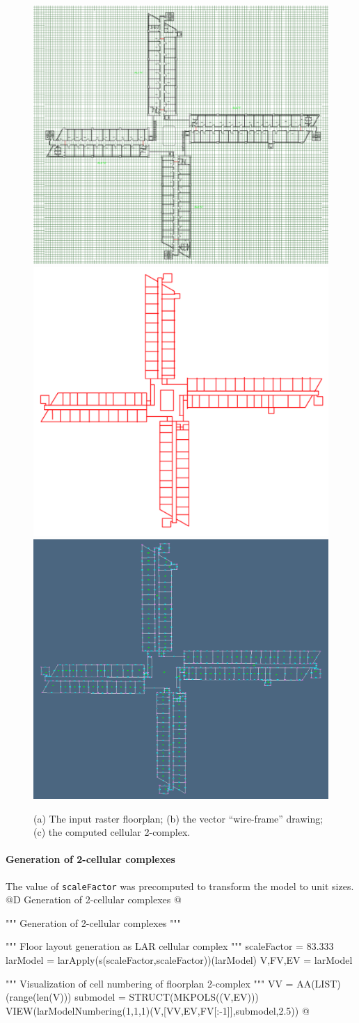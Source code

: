 \documentclass[11pt,oneside]{article}    %
\begin{document}
\begin{figure}[htbp] %
   \centering
   \includegraphics[width=0.325\linewidth]{images/towerplan0} 
   \includegraphics[width=0.325\linewidth]{images/towerplan2} 
   \includegraphics[width=0.325\linewidth]{images/towerplan1} 
   \caption{(a) The input raster floorplan; (b) the vector ``wire-frame'' drawing; (c) the computed cellular 2-complex.}
   \label{fig:towerplan1}
\end{figure}

\paragraph{Generation of 2-cellular complexes}
The value of \texttt{scaleFactor} was precomputed to transform the model to unit sizes.
@D Generation of 2-cellular complexes
@{""" Generation of 2-cellular complexes """

""" Floor layout generation as LAR cellular complex """
scaleFactor = 83.333
larModel = larApply(s(scaleFactor,scaleFactor))(larModel)
V,FV,EV = larModel

""" Visualization of cell numbering of floorplan 2-complex """
VV = AA(LIST)(range(len(V)))
submodel = STRUCT(MKPOLS((V,EV)))
VIEW(larModelNumbering(1,1,1)(V,[VV,EV,FV[:-1]],submodel,2.5))
@}
\end{document}

